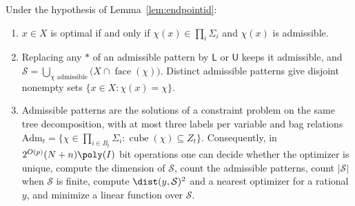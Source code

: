 \begin{corollary}\label{cor:facecsp}
Under the hypothesis of Lemma~\ref{lem:endpointid}:
\begin{enumerate}
\item[(i)] $x\in X$ is optimal if and only if $\chi(x)\in\prod_i\Sigma_i$
and $\chi(x)$ is admissible.
\item[(ii)] Replacing any $\ast$ of an admissible pattern by $\mathsf L$ or
$\mathsf U$ keeps it admissible, and
$\mathcal S=\bigcup_{\chi\text{ admissible}}\bigl(X\cap\operatorname{face}(\chi)\bigr)$.
Distinct admissible patterns give disjoint nonempty sets
$\{x\in X:\chi(x)=\chi\}$.
\item[(iii)] Admissible patterns are the solutions of a constraint problem on
the same tree decomposition, with at most three labels per variable and bag
relations
$\mathrm{Adm}_t=\{\chi\in\prod_{i\in B_t}\Sigma_i:\operatorname{cube}(\chi)
\subseteq Z_t\}$. Consequently, in $2^{O(p)}(N+n)\poly(I)$ bit operations
one can decide whether the optimizer is unique, compute the dimension of
$\mathcal S$, count the admissible patterns, count $|\mathcal S|$ when
$\mathcal S$ is finite, compute $\dist(y,\mathcal S)^2$ and a nearest
optimizer for a rational $y$, and minimize a linear function over
$\mathcal S$.
\end{enumerate}
\end{corollary}

